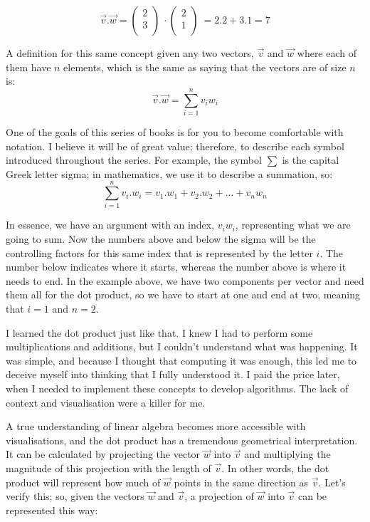 \documentclass[a4,12pt,twosided,openany]{memoir}
\begin{document}
\[\overrightarrow{v}.\overrightarrow{w} = \begin{pmatrix}
 2\\
 3\\
\end{pmatrix}\ \cdot \begin{pmatrix}
 2\\
 1\\
\end{pmatrix}\  = 2.2 + 3.1 = 7\]
\par 
\indent
A definition for this same concept given any two vectors,  $\overrightarrow{v}$ and $\overrightarrow{w}$ where each of them have $n$ elements, which is the same as saying that the vectors are of size $n$ is:
\begin{equation}\label{dotProduct}
\overrightarrow{v}.\overrightarrow{w} = \sum_{i=1}^{n} v_iw_i
\end{equation}
\par 
\indent
One of the goals of this series of books is for you to become comfortable with notation. I believe it will be of great value; therefore, to describe each symbol introduced throughout the series. For example, the symbol $\sum$ is the capital Greek letter sigma; in mathematics, we use it to describe a summation, so:
\[\sum_{i=1}^{n} v_i.w_i = v_1.w_1 + v_2.w_2 + ... + v_nw_n\]
\par 
\indent
In essence, we have an argument with an index, $v_iw_i$, representing what we are going to sum. Now the numbers above and below the sigma will be the controlling factors for this same index that is represented by the letter $i$. The number below indicates where it starts, whereas the number above is where it needs to end. In the example above, we have two components per vector and need them all for the dot product, so we have to start at one and end at two, meaning that $i = 1$ and $n= 2$. 
\par 
\indent
I learned the dot product just like that. I knew I had to perform some multiplications and additions, but I couldn’t understand what was happening. It was simple, and because I thought that computing it was enough, this led me to deceive myself into thinking that I fully understood it. I paid the price later, when I needed to implement these concepts to develop algorithms. The lack of context and visualisation were a killer for me. 
\par 
\indent
A true understanding of linear algebra becomes more accessible with visualisations, and the dot product has a tremendous geometrical interpretation. It can be calculated by projecting the vector $\overrightarrow{w}$ into $\overrightarrow{v}$ and multiplying the magnitude of this projection with the length of $\overrightarrow{v}$. In other words, the dot product will represent how much of $\overrightarrow{w}$ points in the same direction as $\overrightarrow{v}$. Let’s verify this; so, given the vectors  $\overrightarrow{w}$ and $\overrightarrow{v}$, a projection of $\overrightarrow{w}$ into $\overrightarrow{v}$  can be represented this way:
\end{document}
